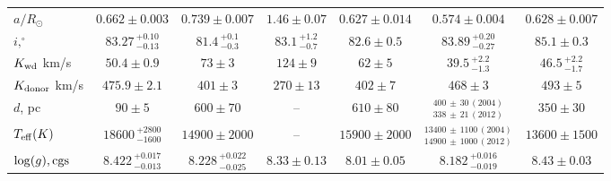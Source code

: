 \begin{landscape}
\begin{table*}
\begin{tabular}{lcccccc}
            $a/R_{\odot}$               & $0.662\pm0.003$                   & $0.739\pm0.007$                       & $1.46\pm0.07$                 & $0.627\pm0.014$               & $0.574\pm0.004$                                           & $0.628\pm0.007$                   \\
            $i, ^\circ$                 & $83.27\,^{+0.10}_{-0.13}$         & $81.4\,^{+0.1}_{-0.3}$                & $83.1\,^{+1.2}_{-0.7}$        & $82.6\pm0.5$                  & $83.89\,^{+0.20}_{-0.27}$                                 & $85.1\pm0.3$                      \\
            $K_{\rm wd}$ km/s           & $50.4\pm0.9$                      & $73\pm3$                              & $124\pm9$                     & $62\pm5$                      & $39.5\,^{+2.2}_{-1.3}$                                    & $46.5\,^{+2.2}_{-1.7}$            \\
            $K_{\rm donor}$ km/s        & $475.9\pm2.1$                     & $401\pm3$                             & $270\pm13$                    & $402\pm7$                     & $468\pm3$                                                 & $493\pm5$                         \\
            \hline
            $d$, pc                     & $90\pm5$                          & $600\pm70$                            & --                            & $610\pm80$                    & $^{400\,\pm\,30\,(2004)}_{338\,\pm\,21\,(2012)}$          & $350\pm30$                        \\
            $T_{\rm eff} (K)$           & $18600\,^{+2800}_{-1600}$         & $14900\pm2000$                        & --                            & $15900\pm2000$                & $^{13400\,\pm\,1100\,(2004)}_{14900\,\pm\,1000\,(2012)}$  & $13600\pm1500$                    \\
            $\log(g), {\rm cgs}$        & $8.422\,^{+0.017}_{-0.013}$       & $8.228\,^{+0.022}_{-0.025}$           & $8.33\pm0.13$                 & $8.01\pm0.05$                 & $8.182\,^{+0.016}_{-0.019}$                               & $8.43\pm0.03$                     \\
            \hline \hline
        \end{tabular}
    \end{table*}


\end{landscape}
